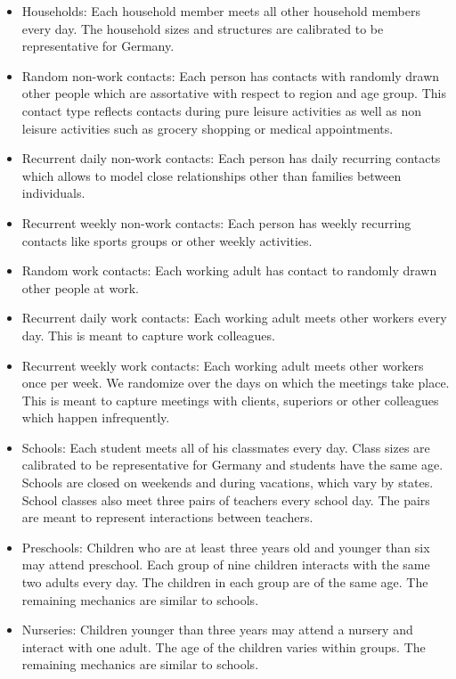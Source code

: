 \begin{itemize}
    \item Households: Each household member meets all other household members every day.
    The household sizes and structures are calibrated to be representative for Germany.

    \item Random non-work contacts: Each person has contacts with randomly drawn other
    people which are assortative with respect to region and age group. This contact type
    reflects contacts during pure leisure activities as well as non leisure activities
    such as grocery shopping or medical appointments.

    \item Recurrent daily non-work contacts: Each person has daily recurring contacts
    which allows to model close relationships other than families between individuals.

    \item Recurrent weekly non-work contacts: Each person has weekly recurring contacts
    like sports groups or other weekly activities.

    \item Random work contacts: Each working adult has contact to randomly drawn other
    people at work.

    \item Recurrent daily work contacts: Each working adult meets other workers every
    day. This is meant to capture work colleagues.

    \item Recurrent weekly work contacts: Each working adult meets other workers once
    per week. We randomize over the days on which the meetings take place. This is meant
    to capture meetings with clients, superiors or other colleagues which happen
    infrequently.

    \item Schools: Each student meets all of his classmates every day. Class sizes are
    calibrated to be representative for Germany and students have the same age. Schools
    are closed on weekends and during vacations, which vary by states. School classes
    also meet three pairs of teachers every school day. The pairs are meant to represent
    interactions between teachers.

    \item Preschools: Children who are at least three years old and younger than six may
    attend preschool. Each group of nine children interacts with the same two adults
    every day. The children in each group are of the same age. The remaining mechanics
    are similar to schools.

    \item Nurseries: Children younger than three years may attend a nursery and interact
    with one adult. The age of the children varies within groups. The remaining
    mechanics are similar to schools.
\end{itemize}

